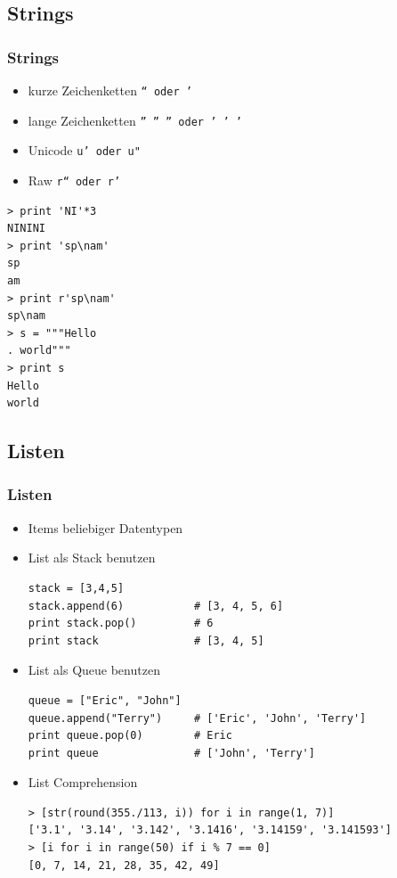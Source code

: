 \documentclass[10pt]{beamer}
\begin{document}
\subsection{Strings}
 \begin{frame}[fragile]
  \frametitle{Strings}
   \begin{itemize}
    \item kurze Zeichenketten  \texttt{`` oder '}
    \item lange Zeichenketten  \texttt{'' '' ''  oder ' ' '}
    \item Unicode \texttt{u' oder u"}
    \item Raw \texttt{r`` oder r'}
   \end{itemize}

   \begin{lstlisting}
> print 'NI'*3
NININI
> print 'sp\nam'
sp
am
> print r'sp\nam'
sp\nam
> s = """Hello 
. world"""
> print s
Hello
world
   \end{lstlisting}
\end{frame}

\subsection{Listen}
\begin{frame}[fragile]
  \frametitle{Listen}
  \begin{itemize}
   \item Items beliebiger Datentypen
   \item List als Stack benutzen
\begin{lstlisting}
stack = [3,4,5]
stack.append(6)           # [3, 4, 5, 6]
print stack.pop()         # 6
print stack               # [3, 4, 5]
\end{lstlisting}
   \item List als Queue benutzen
    \begin{lstlisting}
queue = ["Eric", "John"]
queue.append("Terry")     # ['Eric', 'John', 'Terry']
print queue.pop(0)        # Eric
print queue               # ['John', 'Terry']
\end{lstlisting}
    \item List Comprehension
\begin{lstlisting}
> [str(round(355./113, i)) for i in range(1, 7)]
['3.1', '3.14', '3.142', '3.1416', '3.14159', '3.141593']
> [i for i in range(50) if i % 7 == 0]
[0, 7, 14, 21, 28, 35, 42, 49]
  \end{lstlisting}
   \end{itemize}
\end{frame}
\end{document}
